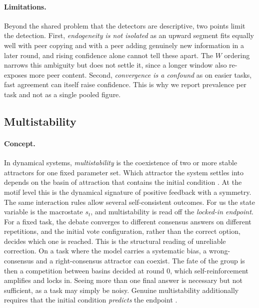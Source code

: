 \paragraph{Limitations.}
Beyond the shared problem that the detectors are descriptive, two points limit the
detection.
First, \emph{endogeneity is not isolated} as an upward segment fits equally well with peer
copying and with a peer adding genuinely new information in a later round, and
rising confidence alone cannot tell these apart. The $W$ ordering narrows this
ambiguity but does not settle it, since a longer window also re-exposes more peer
content. Second, \emph{convergence is a confound} as on easier tasks, fast agreement can
itself raise confidence. This is why we report prevalence per task and not as a
single pooled figure.

\subsection{Multistability}
\label{sec:method:multistability}

\paragraph{Concept.}
In dynamical systems, \emph{multistability} is the coexistence of two or more
stable attractors for one fixed parameter set. Which attractor the system settles
into depends on the basin of attraction that contains the initial condition
\citep{feudel2008complex, pisarchik2014control}. At the motif level this is the
dynamical signature of positive feedback with a symmetry. The same interaction
rules allow several self-consistent outcomes.
For us the state variable is the macrostate $s_t$, and multistability is read off
the \emph{locked-in endpoint}. For a fixed task, the debate converges to different
consensus answers on different repetitions, and the initial vote configuration,
rather than the correct option, decides which one is reached. This is the
structural reading of unreliable correction. On a task where the model carries a
systematic bias, a wrong-consensus and a right-consensus attractor can coexist.
The fate of the group is then a competition between basins decided at round $0$, which
self-reinforcement amplifies and locks in. Seeing more than one final answer is
necessary but not sufficient, as a task may simply be noisy. Genuine multistability
additionally requires that the initial condition \emph{predicts} the endpoint
\citep{pisarchik2014control}.

